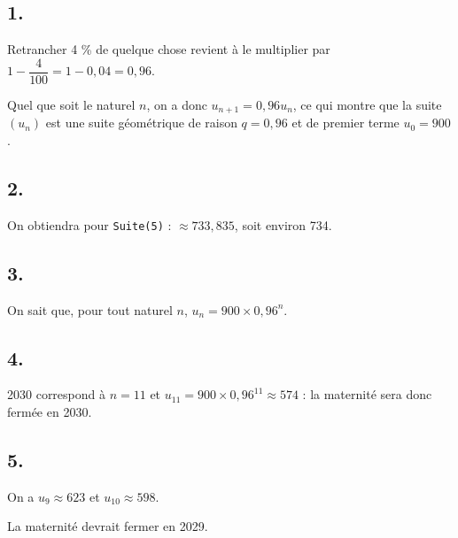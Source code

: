 \subsection*{1.}

Retrancher 4 \% de quelque chose revient à le multiplier par \(1 - \dfrac{4}{100} = 1 - 0{,}04 = 0{,}96\).

Quel que soit le naturel \(n\), on a donc \(u_{n+1} = 0{,}96u_n\), ce qui montre que la suite \((u_n)\) est une suite géométrique de raison \(q = 0{,}96\) et de premier terme \(u_0 = 900\).

\subsection*{2.}

On obtiendra pour \texttt{Suite(5)} : \( \approx 733{,}835 \), soit environ 734.

\subsection*{3.}

On sait que, pour tout naturel \(n\), \(u_n = 900 \times 0{,}96^n\).

\subsection*{4.}

2030 correspond à \(n = 11\) et \(u_{11} = 900 \times 0{,}96^{11} \approx 574\) : la maternité sera donc fermée en 2030.

\subsection*{5.}

On a \(u_9 \approx 623\) et \(u_{10} \approx 598\).

La maternité devrait fermer en 2029.
